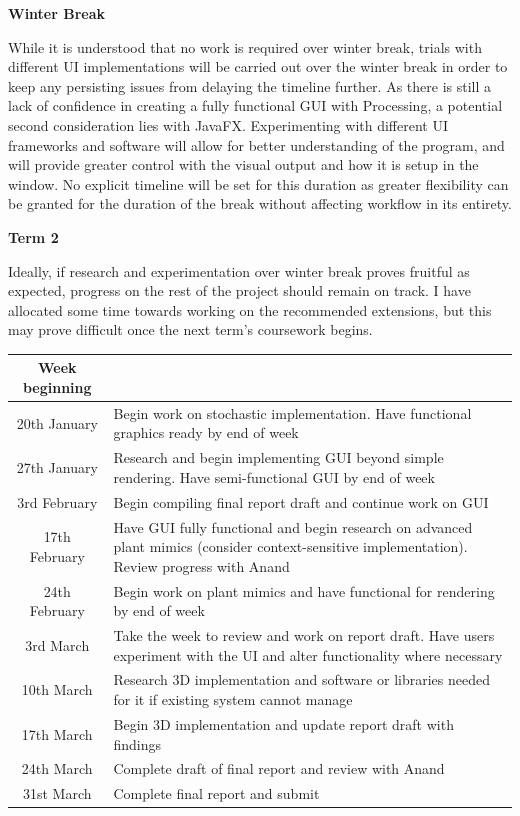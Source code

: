 \documentclass[]{interim_report}
\begin{document}
\textbf{\Large{Winter Break}}

While it is understood that no work is required over winter break, trials with different UI implementations will be carried out over the winter break in order to keep any persisting issues from delaying the timeline further. As there is still a lack of confidence in creating a fully functional GUI with Processing, a potential second consideration lies with JavaFX. Experimenting with different UI frameworks and software will allow for better understanding of the program, and will provide greater control with the visual output and how it is setup in the window. No explicit timeline will be set for this duration as greater flexibility can be granted for the duration of the break without affecting workflow in its entirety.

\textbf{\Large{Term 2}}

Ideally, if research and experimentation over winter break proves fruitful as expected, progress on the rest of the project should remain on track. I have allocated some time towards working on the recommended extensions, but this may prove difficult once the next term's coursework begins. 
\renewcommand{\arraystretch}{1.5}

\begin{longtable}{c|p{12cm}}
    Week beginning\\
    \hline

    20th January & Begin work on stochastic implementation. Have functional graphics ready by end of week\\
    27th January & Research and begin implementing GUI beyond simple rendering. Have semi-functional GUI by end of week\\
    3rd February & Begin compiling final report draft and continue work on GUI\\
    17th February & Have GUI fully functional and begin research on advanced plant mimics (consider context-sensitive implementation). Review progress with Anand\\
    24th February & Begin work on plant mimics and have functional for rendering by end of week\\
    3rd March & Take the week to review and work on report draft. Have users experiment with the UI and alter functionality where necessary\\
    10th March & Research 3D implementation and software or libraries needed for it if existing system cannot manage\\
    17th March & Begin 3D implementation and update report draft with findings\\
    24th March & Complete draft of final report and review with Anand\\
    31st March & Complete final report and submit\\
\end{longtable}
\end{document}
